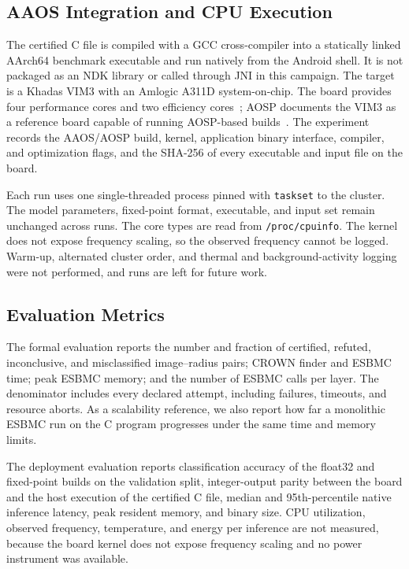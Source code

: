 \subsection{AAOS Integration and CPU Execution}
\label{sec:aaos}

The certified C file is compiled with a GCC cross-compiler into a statically linked AArch64 benchmark executable and run natively from the Android shell. It is not packaged as an NDK library or called through JNI in this campaign. The target is a Khadas VIM3 with an Amlogic A311D system-on-chip. The board provides four \Aseven{} performance cores and two \Athree{} efficiency cores~\cite{KhadasVIM3}; AOSP documents the VIM3 as a reference board capable of running AOSP-based builds~\cite{AOSPReferenceBoards}. The experiment records the AAOS/AOSP build, kernel, application binary interface, compiler, and optimization flags, and the SHA-256 of every executable and input file on the board.

Each run uses one single-threaded process pinned with \texttt{taskset} to the \Aseven{} cluster. The model parameters, fixed-point format, executable, and input set remain unchanged across runs. The core types are read from \texttt{/proc/cpuinfo}. The kernel does not expose frequency scaling, so the observed frequency cannot be logged. Warm-up, alternated cluster order, and thermal and background-activity logging were not performed, and \Athree{} runs are left for future work.

\subsection{Evaluation Metrics}
The formal evaluation reports the number and fraction of certified, refuted, inconclusive, and misclassified image--radius pairs; CROWN finder and ESBMC time; peak ESBMC memory; and the number of ESBMC calls per layer. The denominator includes every declared attempt, including failures, timeouts, and resource aborts. As a scalability reference, we also report how far a monolithic ESBMC run on the C program progresses under the same time and memory limits.

The deployment evaluation reports classification accuracy of the float32 and fixed-point builds on the validation split, integer-output parity between the board and the host execution of the certified C file, median and 95th-percentile native inference latency, peak resident memory, and binary size. CPU utilization, observed frequency, temperature, and energy per inference are not measured, because the board kernel does not expose frequency scaling and no power instrument was available.
